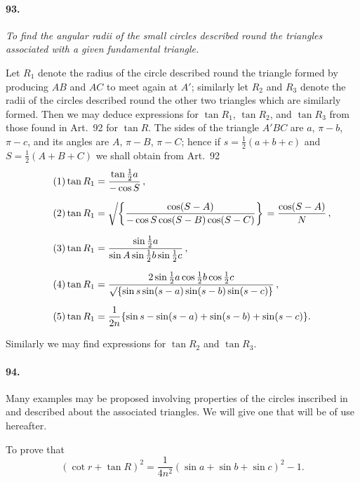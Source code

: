 \documentclass{book}[2004/02/16]
\newcommand{\Surd}[1]{\left\delimiter"4270370 #1\right.}
\begin{document}
\begin{mainmatter}
\begin{spacing}{1.3}
\paragraph{93.} \textit{To find the angular radii of the small circles described
round the triangles associated with a given fundamental triangle.}

Let $R_1$ denote the radius of the circle described round the
triangle formed by producing $AB$ and $AC$ to meet again at $A'$;
similarly let $R_2$ and $R_3$ denote the radii of the circles described
round the other two triangles which are similarly formed. Then
we may deduce expressions for $\tan R_1$, $\tan R_2$, and $\tan R_3$ from
those found in Art.~92 for $\tan R$. The sides of the triangle $A'BC$
are $a$, $\pi-b$, $\pi-c$, and its angles are $A$, $\pi-B$, $\pi-C$; hence if
$s = \tfrac{1}{2} (a + b + c)$ and $S = \tfrac{1}{2} (A + B + C)$ we shall obtain from
Art.~92
\begin{align*}
\tag{1}
  \tan R_1 &= \frac{\tan\frac{1}{2}a}{-\cos S} \,,
\\[1.5ex]
\tag{2}
  \tan R_1 &= \Surd{\left\{
  \frac{\cos(S-A)}{-\cos S\cos(S-B)\cos(S-C)}\right\}}
= \frac{\cos(S-A)}{N} \,,
\\[1.5ex]
\tag{3}
  \tan R_1 &= \frac{\sin\frac{1}{2}a}
                   {\sin A\sin\frac{1}{2}b\sin\frac{1}{2}c} \,,
\\[1.5ex]
\tag{4}
  \tan R_1
&= \frac{2\sin\frac{1}{2}a\cos\frac{1}{2}b\cos\frac{1}{2}c}
        {\surd{\{\sin s\sin(s-a)\sin(s-b)\sin(s-c)\}}} \,,
\\[1.5ex]
\tag{5}
  \tan R_1
&=\frac{1}{2n}
  \{\sin s - \sin(s-a) + \sin(s-b) + \sin(s-c) \}.
\end{align*}

Similarly we may find expressions for $\tan R_2$ and $\tan R_3$.

\paragraph{94.} Many examples may be proposed involving properties of
the circles inscribed in and described about the associated triangles.
We will give one that will be of use hereafter.

To prove that
\[(\cot r + \tan R)^2=\dfrac{1}{4n^2}(\sin a+\sin b+\sin c)^2 -1.\]


\end{spacing}
\end{mainmatter}
\end{document}
